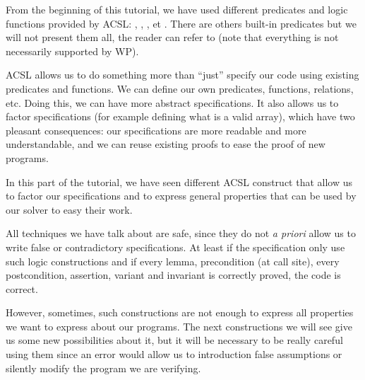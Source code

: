 From the beginning of this tutorial, we have used different predicates
and logic functions provided by ACSL: ,
, ,
 et . There are others
built-in predicates but we will not present them all, the reader can refer to
(note that everything is not necessarily supported by WP).



ACSL allows us to do something more than ``just'' specify our code using
existing predicates and functions. We can define our own predicates,
functions, relations, etc. Doing this, we can have more abstract
specifications. It also allows us to factor specifications (for example
defining what is a valid array), which have two pleasant consequences:
our specifications are more readable and more understandable, and we can
reuse existing proofs to ease the proof of new programs.


















\horizontalLine

In this part of the tutorial, we have seen different ACSL construct that
allow us to factor our specifications and to express general properties
that can be used by our solver to easy their work.




All techniques we have talk about are safe, since they do not \emph{a
priori} allow us to write false or contradictory specifications. At
least if the specification only use such logic constructions and if
every lemma, precondition (at call site), every postcondition,
assertion, variant and invariant is correctly proved, the code is
correct.




However, sometimes, such constructions are not enough to express all
properties we want to express about our programs. The next constructions
we will see give us some new possibilities about it, but it will be
necessary to be really careful using them since an error would allow us
to introduction false assumptions or silently modify the program we are
verifying.
